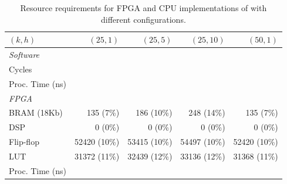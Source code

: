 \begin{table}
\begin{center}
\small
\begin{tabular}{ l r r r r } 
\toprule
$(k, h)$ & $(25, 1)$ & $(25, 5)$ & $(25,10)$ & $(50, 1)$ \\
\midrule
\emph{Software} & & & & \\
\cmidrule{1-1}
Cycles & & & & \\
Proc. Time (ns) & & & & \\
\midrule
\emph{FPGA} & & & & \\
\cmidrule{1-1}
BRAM (18Kb) & 135 (7\%) & 186 (10\%) & 248 (14\%) & 135 (7\%) \\
DSP & 0 (0\%) & 0 (0\%) & 0 (0\%) & 0 (0\%) \\
Flip-flop & 52420 (10\%) & 53415 (10\%) & 54497 (10\%) & 52420 (10\%) \\
LUT & 31372 (11\%) & 32439 (12\%) & 33136 (12\%) & 31368 (11\%) \\
Proc. Time (ns) & & & & \\
\bottomrule
\end{tabular}
\caption{Resource requirements for FPGA and CPU implementations of \OurSys with different configurations.}
\label{tab:microbenchmarks}
\end{center}
\end{table}

